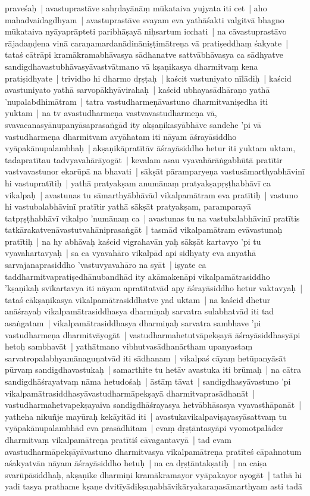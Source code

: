 \documentclass[article,12pt,a4paper]{memoir}
\begin{document}
praveśaḥ | \label{thakur75-88.24} avastuprastāve sahṛdayānāṃ mūkataiva yujyata iti cet | aho mahadvaidagdhyam | avastuprastāve svayam eva yathāśakti valgitvā bhagno mūkataiva nyāyaprāpteti paribhāṣayā niḥsartum icchati | na cāvastuprastāvo rājadaṇḍena vinā caraṇamardanādināniṣṭimātreṇa vā pratiṣeddhaṃ śakyate | tataś cātrāpi kramākramabhāvasya sādhanatve sattvābhāvasya ca sādhyatve sandigdhavastubhāvasyāvastvātmano vā kṣaṇikasya dharmitvaṃ kena pratiṣidhyate | \label{thakur75-89.1} trividho hi dharmo dṛṣṭaḥ | kaścit vastuniyato nīlādiḥ | kaścid avastuniyato yathā sarvopākhyāvirahaḥ | kaścid ubhayasādhāraṇo yathā 'nupalabdhimātram | tatra vastudharmeṇāvastuno dharmitvaniṣedha iti yuktam | na tv avastudharmeṇa vastvavastudharmeṇa vā, svavacanasyānupanyāsaprasaṅgād ity akṣaṇikasyābhāve sandehe 'pi vā vastudharmeṇa dharmitvam avyāhatam iti nāyam āśrayāsiddho vyāpakānupalambhaḥ | \label{thakur75-89.6} akṣaṇikāpratītāv āśrayāsiddho hetur iti yuktam uktam, tadapratītau tadvyavahārāyogāt | kevalam asau vyavahārāṅgabhūtā pratītir vastvavastunor ekarūpā na bhavati | sākṣāt pāramparyeṇa vastusāmarthyabhāvinī hi vastupratītiḥ | yathā pratyakṣam anumānaṃ pratyakṣapṛṣṭhabhāvī ca vikalpaḥ | avastunas tu sāmarthyābhāvād vikalpamātram eva pratītiḥ | vastuno hi vastubalabhāvinī pratītir yathā sākṣāt pratyakṣam, paramparayā tatpṛṣṭhabhāvī vikalpo 'numānaṃ ca | avastunas tu na vastubalabhāvinī pratītis tatkārakatvenāvastutvahāniprasaṅgāt | tasmād vikalpamātram evāvastunaḥ pratītiḥ | \label{thakur75-89.12} na hy abhāvaḥ kaścid vigrahavān yaḥ sākṣāt kartavyo 'pi tu vyavahartavyaḥ | sa ca vyavahāro vikalpād api sidhyaty eva anyathā sarvajanaprasiddho 'vastuvyavahāro na syāt | iṣyate ca taddharmitvapratiṣedhānubandhād ity akāmakenāpi vikalpamātrasiddho 'kṣaṇikaḥ svīkartavya iti nāyam apratītatvād apy āśrayāsiddho hetur vaktavyaḥ | tataś cākṣaṇikasya vikalpamātrasiddhatve yad uktam | \label{thakur75-89.17} na kaścid dhetur anāśrayaḥ vikalpamātrasiddhasya dharmiṇaḥ sarvatra sulabhatvād iti tad asaṅgatam | vikalpamātrasiddhasya dharmiṇaḥ sarvatra sambhave 'pi vastudharmeṇa dharmitvāyogāt | vastudharmahetutvāpekṣayā āśrayāsiddhasyāpi hetoḥ sambhavāt | \label{thakur75-89.20} yathātmano vibhutvasādhanārtham upanyastaṃ sarvatropalabhyamānaguṇatvād iti sādhanam | vikalpaś cāyaṃ hetūpanyāsāt pūrvaṃ sandigdhavastukaḥ | samarthite tu hetāv avastuka iti brūmaḥ | \label{thakur75-89.23} na cātra sandigdhāśrayatvaṃ nāma hetudośaḥ | āstāṃ tāvat | sandigdhasyāvastuno 'pi vikalpamātrasiddhasyāvastudharmāpekṣayā dharmitvaprasādhanāt | vastudharmahetvapekṣayaiva sandigdhāśrayasya hetvābhāsasya vyavasthāpanāt | yatheha nikuñje mayūraḥ kekāyitād iti | avastukavikalpaviṣayasyāsattvaṃ tu vyāpakānupalambhād eva prasādhitam | evaṃ dṛṣṭāntasyāpi vyomotpalāder dharmitvaṃ vikalpamātreṇa pratītiś cāvagantavyā | tad evam avastudharmāpekṣāyāvastuno dharmitvasya vikalpamātreṇa pratīteś cāpahnotum aśakyatvān nāyam āśrayāsiddho hetuḥ | na ca dṛṣṭāntakṣatiḥ | \label{thakur75-89.30} na caiṣa svarūpāsiddhaḥ, akṣaṇike dharmiṇi kramākramayor vyāpakayor ayogāt | tathā hi yadi tasya prathame kṣaṇe dvitīyādikṣaṇabhāvikāryakaraṇasāmarthyam asti tadā 
\end{document}
